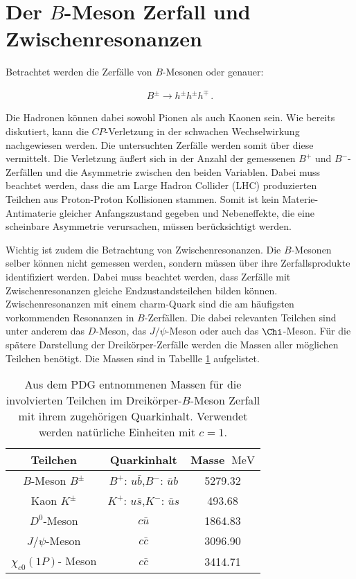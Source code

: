\section{Der $B$-Meson Zerfall und Zwischenresonanzen}

Betrachtet werden die Zerfälle von $B$-Mesonen oder genauer: 

\begin{align}
    B^{\pm} \to h^{\pm} h^{\pm}  h^{\mp} \, .
\end{align}

Die Hadronen können dabei sowohl Pionen als auch Kaonen sein. Wie bereits diskutiert, kann die 
$CP$-Verletzung in der schwachen Wechselwirkung nachgewiesen werden. Die untersuchten Zerfälle 
werden somit über diese vermittelt. Die Verletzung äußert sich in der Anzahl der gemessenen 
$B^+$ und $B^-$-Zerfällen und die Asymmetrie zwischen den beiden Variablen. Dabei muss beachtet 
werden, dass die am Large Hadron Collider (LHC) produzierten Teilchen aus Proton-Proton 
Kollisionen stammen. Somit ist kein Materie-Antimaterie gleicher Anfangszustand gegeben 
und Nebeneffekte, die eine scheinbare Asymmetrie verursachen, müssen berücksichtigt werden. \par 

Wichtig ist zudem die Betrachtung von Zwischenresonanzen. Die $B$-Mesonen selber können nicht 
gemessen werden, sondern müssen über ihre Zerfallsprodukte identifiziert werden. Dabei muss 
beachtet werden, dass Zerfälle mit Zwischenresonanzen gleiche Endzustandsteilchen bilden 
können. Zwischenresonanzen mit einem charm-Quark sind die am häufigsten vorkommenden 
Resonanzen in $B$-Zerfällen. Die dabei relevanten Teilchen sind unter anderem das 
$D$-Meson, das $J/\psi$-Meson oder auch das $\Chi$-Meson. Für die spätere Darstellung der 
Dreikörper-Zerfälle werden die Massen aller möglichen Teilchen benötigt. Die Massen sind in 
Tabellle \ref{tab:PDGMassen} aufgelistet.

\begin{table}
    \centering 
    \caption{Aus dem PDG \cite{PDG} entnommenen Massen für die involvierten Teilchen im 
        Dreikörper-$B$-Meson Zerfall mit ihrem zugehörigen Quarkinhalt. Verwendet werden natürliche 
        Einheiten mit $c = 1$.}
    \label{tab:PDGMassen}
    \begin{tabular}{c c c} 
    \toprule 
    {Teilchen} & {Quarkinhalt} & {Masse $\SI{}{\mega\electronvolt}$} \\
    \midrule
    {$B$-Meson $B^{\pm}$} & {$B^+$: $u\bar{b}$,$B^-$: $\bar{u}b$} & 5279.32 \\ 
    {Kaon $K^{\pm}$} & {$K^+$: $u\bar{s}$,$K^-$: $\bar{u}s$} & 493.68 \\
    {$D^0$-Meson} & {$c\bar{u}$} & 1864.83 \\ 
    {$J/\psi$-Meson} &{$c\bar{c}$} & 3096.90 \\ 
    {$\chi_{c0}\left(1P\right)$- Meson} & {$c\bar{c}$}& 3414.71 \\
    \bottomrule
    \end{tabular}
\end{table}